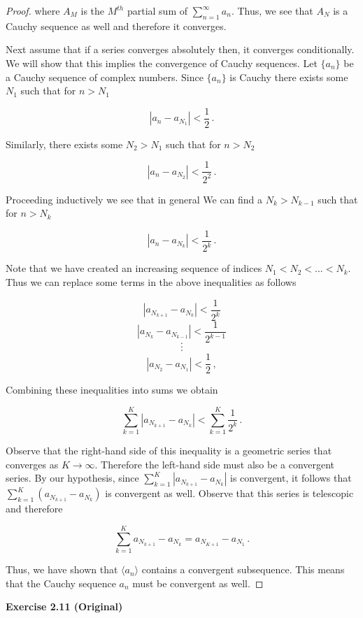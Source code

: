 \documentclass[a4paper]{article}
\newcommand {\m} {\cdot}
\numberwithin{equation}{section}
\begin{document}
\begin{description}
\begin{proof}
	where $A_M$ is the $M^{th}$ partial sum of $\sum_{n=1}^\infty a_n$. Thus, we see that ${A_N}$ is a Cauchy sequence as well and therefore it converges. 

Next assume that if a series converges absolutely then, it converges conditionally. We will show that this implies the convergence of Cauchy sequences. Let $\lbrace a_n \rbrace$ be a Cauchy sequence of complex numbers. Since $\lbrace a_n \rbrace$ is Cauchy there exists some $N_1$ such that for $n > N_1$

$$|a_n - a_{N_1}| < \frac{1}{2}\,.$$

Similarly, there exists some $N_2 > N_1$ such that for $n > N_2$

$$|a_n - a_{N_2}| < \frac{1}{2^2}\,.$$

Proceeding inductively we see that in general We can find a $N_k > N_{k-1}$ such that for $n > N_k$

$$|a_n - a_{N_k}| < \frac{1}{2^k}\,.$$

Note that we have created an increasing sequence of indices $N_1 < N_2 < ... < N_k$. Thus we can replace some terms in the above inequalities as follows

	$$|a_{N_{k+1}} - a_{N_k}| < \frac{1}{2^k}$$
	$$|a_{N_k} - a_{N_{k-1}}| < \frac{1}{2^{k-1}}$$
	$$\m$$
	$$\m$$
	$$\m$$
	$$|a_{N_2} - a_{N_{1}}| < \frac{1}{2}\,,$$
	
	Combining these inequalities into sums we obtain
	
	$$\sum_{k=1}^K |a_{N_{k+1}} - a_{N_{k}}| < \sum_{k=1}^K \frac{1}{2^k}\,.$$
	
	Observe that the right-hand side of this inequality is a geometric series that converges as $K \rightarrow \infty$. Therefore the left-hand side must also be a convergent series. By our hypothesis, since $\sum_{k=1}^K |a_{N_{k+1}} - a_{N_{k}}|$ is convergent, it follows that $\sum_{k=1}^K\left( a_{N_{k+1}} - a_{N_{k}}\right)$ is convergent as well.  Observe that this series is telescopic and therefore
	
	$$\sum_{k=1}^K a_{N_{k+1}} - a_{N_{k}} = a_{N_{K+1}} - a_{N_1}\,.$$
	
	Thus, we have shown that $\langle a_n \rangle$ contains a convergent subsequence. This means that the Cauchy sequence ${a_n}$ must be convergent as well.

\end{proof}


\item \textbf{Exercise 2.11 (Original)}


\end{description}
\end{document}

